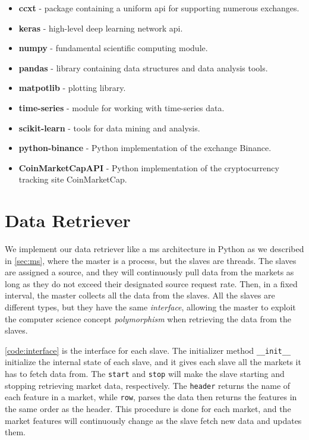 \begin{itemize}
    \item \textbf{ccxt} - package containing a uniform \ac{api} for supporting numerous exchanges.
    \item \textbf{keras} - high-level deep learning network \ac{api}.
    \item \textbf{numpy} - fundamental scientific computing module.
    \item \textbf{pandas} - library containing data structures and data analysis tools.
    \item \textbf{matpotlib} - plotting library.
    \item \textbf{time-series} - module for working with time-series data.  
    \item \textbf{scikit-learn} - tools for data mining and analysis.
    \item \textbf{python-binance} - Python implementation of the exchange Binance.
    \item \textbf{CoinMarketCapAPI} - Python implementation of the cryptocurrency tracking site CoinMarketCap.
\end{itemize}

\section{Data Retriever}
We implement our data retriever like a \ac{ms} architecture in Python as we described in \autoref{sec:ms}, where the master is a process, but the slaves are threads. The slaves are assigned a source, and they will continuously pull data from the markets as long as they do not exceed their designated source request rate. Then, in a fixed interval, the master collects all the data from the slaves. All the slaves are different types, but they have the same \emph{interface}, allowing the master to exploit the computer science concept \emph{polymorphism} when retrieving the data from the slaves. 

\autoref{code:interface} is the interface for each slave. The initializer method \texttt{\_\_init\_\_} initialize the internal state of each slave, and it gives each slave all the markets it has to fetch data from. The \texttt{start} and \texttt{stop} will make the slave starting and stopping retrieving market data, respectively. The \texttt{header} returns the name of each feature in a market, while \texttt{row}, parses the data then returns the features in the same order as the header. This procedure is done for each market, and the market features will continuously change as the slave fetch new data and updates them.

